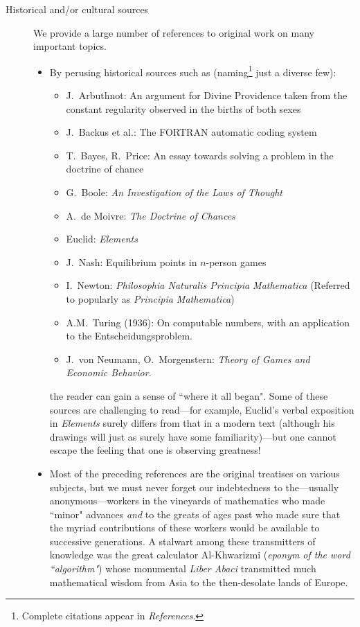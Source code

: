 \begin{description}
\item[{\sc Historical and/or cultural sources}]
We provide a large number of references to original work on many important topics. 
  \begin{itemize}
  \item
By perusing historical sources such as (naming\footnote{Complete citations appear in {\it References}.} just a diverse few): 
     \begin{itemize}
     \item
J.~Arbuthnot: An argument for Divine Providence taken from the constant regularity observed in the births of both sexes
     \item
J.~Backus et al.: The FORTRAN automatic coding system
      \item
T.~Bayes, R.~Price: An essay towards solving a problem in the doctrine of chance
      \item
G.~Boole: {\it An Investigation of the Laws of Thought}   
     \item
A.~de Moivre: {\it The Doctrine of Chances}
     \item
Euclid: {\it Elements} 
    \item
J.~Nash: Equilibrium points in $n$-person games
    \item
I.~Newton: {\it Philosophia Naturalis Principia Mathematica}
(Referred to popularly as {\it Principia Mathematica})
    \item
A.M.~Turing (1936): On computable numbers, with an application to the Entscheidungsproblem.
    \item
J.~von Neumann, O.~Morgenstern: {\it Theory of Games and Economic Behavior.}
    \end{itemize}
the reader can gain a sense of ``where it all began".  Some of these sources are challenging to read---for example, Euclid's verbal exposition in {\it Elements} surely differs from that in a modern text (although his drawings will just as surely have some familiarity)---but one cannot escape the feeling that one is observing greatness!

\item
Most of the preceding references are the original treatises on various subjects, but we must never forget our indebtedness to the---usually anonymous---workers in the vineyards of mathematics who 
made ``minor" advances {\em and} to the greats of ages past who made sure that the myriad contributions of these workers would be available to successive generations.  A stalwart among these transmitters of knowledge was the great calculator Al-Khwarizmi ({\em eponym of the word ``algorithm"}) whose monumental {\it Liber Abaci} transmitted much mathematical wisdom from Asia to the then-desolate lands of Europe.


\end{itemize}
\end{description}
